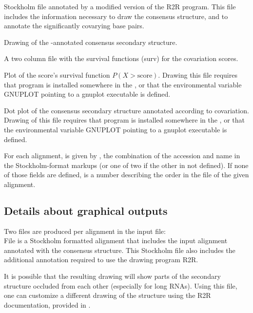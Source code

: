\begin{sreitems}{}
\item[\emprog{rnafile\_msaname.R2R.sto}] Stockholm file annotated by a
  modified version of the R2R program. This file includes the
  information necessary to draw the consensus structure, and to
  annotate the significantly covarying base pairs.
%
\item[\emprog{rnafile\_msaname.R2R.sto.\{pdf,svg\}}] Drawing of the
  \rscape-annotated consensus secondary structure.
%
\item[\emprog{rnafile\_msaname.surv}] A two column file with the 
survival functions (surv) for the covariation scores.
%
\item[\emprog{rnafile\_msaname.surv.ps}] Plot of the score's survival function
$P(X > \mbox{score})$. Drawing this
file requires that program  is installed somewhere in
the
, or that the environmental variable GNUPLOT 
pointing to a gnuplot executable is defined.
%
\item[\emprog{rnafile\_msaname.dplot.\{ps,svg\}}] Dot plot of the consensus
  secondary structure annotated according to covariation. Drawing of this
file requires that program  is installed somewhere in the
, or that the environmental variable GNUPLOT 
pointing to a gnuplot executable is defined.
%
\end{sreitems}
For each alignment,  is given
by , the combination of the accession  and name  in the Stockholm-format markups (or
one of two if the other in not defined).  If none of those fields are
defined,  is a number describing the order in the
file of the given alignment.

\subsection{Details about graphical outputs}
 Two files are produced per alignment in the input file: \\

 File  is a Stockholm
 formatted alignment that includes the input alignment annotated with
 the consensus structure. This Stockholm file also includes the
 additional annotation required to use the drawing program R2R.

 It is possible that the resulting drawing will show parts of the
 secondary structure occluded from each other (especially for long
 RNAs).  Using this file, one can customize a different drawing of the
 structure using the R2R documentation, provided in
 .\\

